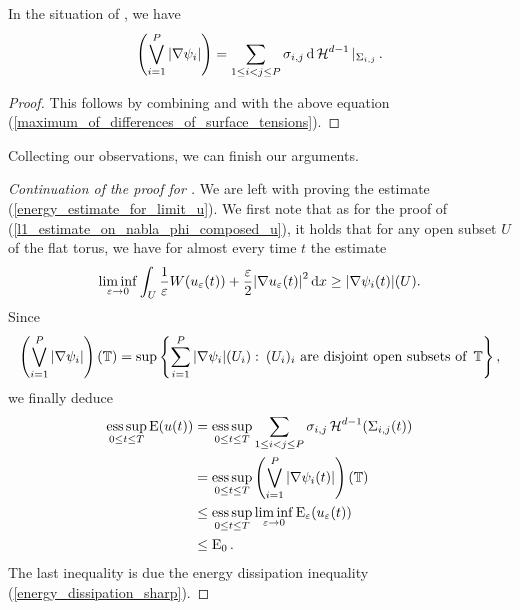 \begin{proposition}
	In the situation of  , we have
	\begin{equation*}
		\left(
			\bigvee_{ i = 1 }^{ P }
			\abs{ \nabla \psi_{ i } }
		\right)
		=
		\sum_{ 1 \leq i < j \leq P }
		 \sigma_{ i , j }
		 \dd{ \operatorname{\mathcal{H}}^{ d - 1 } |_{ \Sigma_{ i , j } } }.
	\end{equation*}
\end{proposition}

\begin{proof}
	This follows by combining  and  with the above equation (\ref{maximum_of_differences_of_surface_tensions}).
\end{proof}

Collecting our observations, we can finish our arguments.

\begin{proof}[Continuation of the proof for ]
	We are left with proving the estimate (\ref{energy_estimate_for_limit_u}). We first note that as for the proof of (\ref{l1_estimate_on_nabla_phi_composed_u}), it holds that for any open subset $ U $ of the flat torus, we have for almost every time $ t $ the estimate
	\begin{equation*}
		\liminf_{ \varepsilon \to 0 } 
			\int_{ U }
				\frac{ 1 }{ \varepsilon }
				W ( u_{ \varepsilon } ( t )  )
				+
				\frac{ \varepsilon }{ 2 }
				\abs{ \nabla u_{ \varepsilon } ( t ) }^{ 2 }
			\dd{ x }
		\geq
		\abs{ \nabla \psi_{ i } ( t ) } ( U ).
	\end{equation*}
	Since
	\begin{equation*}
		\left(
		\bigvee_{ i = 1 }^{ P }
			\abs{ \nabla \psi_{ i } } 
		\right) 
		( \operatorname{\mathbb{T}} )
		=
		\sup \left\{
			\sum_{ i = 1 }^{ P }
				\abs{ \nabla \psi_{ i } } ( U_{ i } )
			\, \colon \,
			( U_{ i } )_{ i } \text{ are disjoint open subsets of } \operatorname{\mathbb{T}}
		\right\},
	\end{equation*}
	we finally deduce
	\begin{align*}
		\operatorname*{ess\,sup}_{ 0 \leq t \leq T }
			\operatorname{E} ( u ( t ) )
		& =
		\operatorname*{ess\,sup}_{ 0 \leq t \leq T }
			\sum_{ 1 \leq i < j \leq P }
				\sigma_{ i , j }
				\operatorname{\mathcal{H}}^{ d - 1 } ( \Sigma_{ i , j } ( t ) )
		\\
		& = \operatorname*{ess\,sup}_{ 0 \leq t \leq T }
		\left(
			\bigvee_{ i = 1 }^{ P }
				\abs{ \nabla \psi_{ i } ( t ) }
		\right) ( \operatorname{\mathbb{T}} )
		\\
		& \leq
		\operatorname*{ess\,sup}_{ 0 \leq t \leq T }
			\liminf_{ \varepsilon \to 0 }
				\operatorname{E}_{ \varepsilon } ( u_{ \varepsilon } ( t ) )
		\\
		& \leq
		\operatorname{E}_{ 0 }.
	\end{align*}
	The last inequality is due the energy dissipation inequality (\ref{energy_dissipation_sharp}).
\end{proof}

